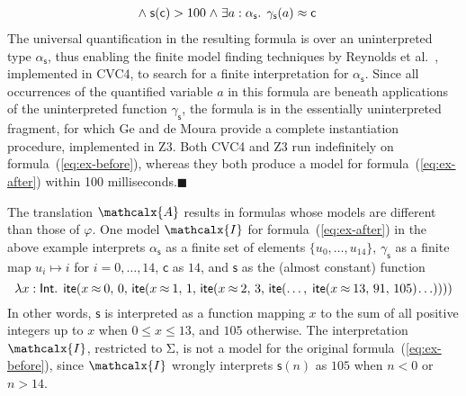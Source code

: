 \documentclass[runningheads,a4paper]{llncs}
\newcommand{\con}[1]{\mathsf{#1}}
\let\const=\con
\let\oldSigma=\Sigma
\def\Sigma{\mathrm{\oldSigma}}
\let\oldwedge=\wedge
\def\wedge{\mathrel{\oldwedge}}
\newcommand\cvc{CVC4\xspace}
\newcommand\ziii{Z3\xspace}
\newcommand{\teq}{\approx}
\newcommand{\I}{\mathcalx{I}}
\newcommand{\conv}{\mathcalx{A}}
\newcommand{\typeint}{\ty{Int}}
\newcommand\ty[1]{\con{#1}}
\newcommand{\lite}{\con{ite}}
\newcommand\concret{\gamma} %
\newcommand{\farg}[1]{\concret_{#1}}
\newcommand{\fargtype}[1]{\alpha_{#1}}
\newcommand{\rem}[1]{\textcolor{red}{[#1]}}
\newcommand{\ct}[1]{\rem{#1 --ct}}
\newcommand{\negvthinspace}{\kern-0.083333em}
\newcommand\xend{{\hfill$\scriptstyle\blacksquare$}}
\begin{document}
\begin{example}
\begin{equation}
\begin{aligned}[c]
\begin{aligned}[t]
\end{aligned}
\\[-\jot]
 & {\wedge}\; \con{s}( \con{c} ) > 100 \wedge \exists a : {\fargtype{\con{s}}}.\;\, \farg{\con{s}}( a ) \teq \con{c}
\end{aligned}
\end{equation}
%
The universal quantification in the resulting formula is over an uninterpreted
type $\fargtype{\con{s}}$, thus enabling the finite model finding
techniques by Reynolds et al.\ \cite{ReyEtAl-1-RR-13,reynolds-et-al-2013},
implemented in \cvc, to search for a finite interpretation for $\fargtype{\con{s}}$. 
Since all occurrences of the quantified variable $a$ in this formula are 
beneath applications of the uninterpreted function $\farg{\con{s}}$, 
the formula is in the essentially uninterpreted fragment,
for which Ge and de Moura \cite{GeDeM-CAV-09} provide 
a complete instantiation procedure, implemented in \ziii. 
Both
\cvc and \ziii run indefinitely on formula~(\ref{eq:ex-before}), 
whereas they both produce a model for formula~(\ref{eq:ex-after}) 
within 100 milliseconds.\xend
\end{example}

The translation $\conv$ results in formulas whose models are different than those of $\varphi$.
One model $\I$ for formula~(\ref{eq:ex-after}) in the above example interprets
$\fargtype{\con{s}}$ as a finite set of elements $\{ u_0, \ldots, u_{14} \}$,
$\farg{\con{s}}$ as a finite map $u_i \mapsto i$ for $i = 0, \ldots, 14$,
$\con{c}$ as $14$,
and $\con{s}$ as the (almost constant) function
%
\begin{equation} \label{eq:approx-interp}
\lambda x : \typeint.\;\, \lite( x \mathbin{\teq} 0,\, 0,\,
  \lite( x \mathbin{\teq} 1,\, 1,\,
    \lite( x \mathbin{\teq} 2,\, 3,\,
      \lite(\ldots,\; \lite( x \mathbin{\teq} 13,\, 91,\, 105 )\negvthinspace \ldots ))))
\end{equation}
%
In other words, $\const{s}$ is interpreted as a function mapping $x$ to the sum
of all positive integers up to $x$ when $0 \leq x \leq 13$, and $105$
otherwise.
The interpretation $\I$, restricted to $\Sigma$, is {not} a model for the original formula~(\ref{eq:ex-before}),
since $\I$ wrongly interprets $\con{s}( n )$ as $105$ when $n < 0$ or $n > 14$.
\end{document}
